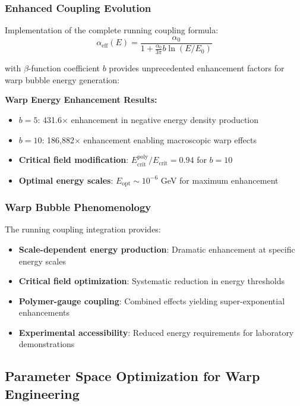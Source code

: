 \documentclass[11pt]{article}
\begin{document}
\subsubsection{Enhanced Coupling Evolution}
Implementation of the complete running coupling formula:
\begin{equation}
\alpha_{\text{eff}}(E) = \frac{\alpha_0}{1 + \frac{\alpha_0}{3\pi} b \ln(E/E_0)}
\end{equation}

with $\beta$-function coefficient $b$ provides unprecedented enhancement factors for warp bubble energy generation:

\textbf{Warp Energy Enhancement Results:}
\begin{itemize}
    \item \textbf{$b = 5$}: 431.6$\times$ enhancement in negative energy density production
    \item \textbf{$b = 10$}: 186,882$\times$ enhancement enabling macroscopic warp effects
    \item \textbf{Critical field modification}: $E_{\text{crit}}^{\text{poly}}/E_{\text{crit}} = 0.94$ for $b=10$
    \item \textbf{Optimal energy scales}: $E_{\text{opt}} \sim 10^{-6}$ GeV for maximum enhancement
\end{itemize}

\subsubsection{Warp Bubble Phenomenology}
The running coupling integration provides:
\begin{itemize}
    \item \textbf{Scale-dependent energy production}: Dramatic enhancement at specific energy scales
    \item \textbf{Critical field optimization}: Systematic reduction in energy thresholds
    \item \textbf{Polymer-gauge coupling}: Combined effects yielding super-exponential enhancements
    \item \textbf{Experimental accessibility}: Reduced energy requirements for laboratory demonstrations
\end{itemize}

\subsection{Parameter Space Optimization for Warp Engineering}
\end{document}
